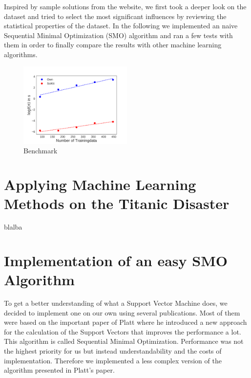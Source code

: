 Inspired by sample solutions from the website, we first took a deeper look on the dataset and tried to select the most significant influences by reviewing the statistical properties of the dataset. In the following we implemented an naive Sequential Minimal Optimization (SMO) algorithm and ran a few tests with them in order to finally compare the results with other machine learning algorithms.


\begin{figure}
  \centering
    \includegraphics[width=0.5\textwidth]{media_saved/benchmark}
  \caption{Benchmark}
  \label{fig:gull}
\end{figure}

\section{Applying Machine Learning Methods on the Titanic Disaster}
blalba

\section{Implementation of an easy SMO Algorithm}
To get a better understanding of what a Support Vector Machine does, we decided to implement one on our own using several publications. Most of them were based on the important paper of Platt \cite{platt} where he introduced a new approach for the calculation of the Support Vectors that improves the performance a lot. This algorithm is called Sequential Minimal Optimization. Performance was not the highest priority for us but instead understandability and the costs of implementation. Therefore we implemented a less complex version of the algorithm presented in Platt's paper.


